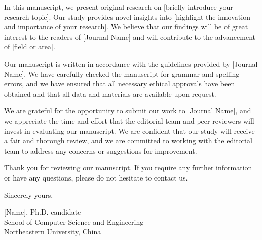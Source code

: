 \documentclass{article}
\begin{document}
In this manuscript, we present original research on [briefly introduce your research topic]. Our study provides novel insights into [highlight the innovation and importance of your research]. We believe that our findings will be of great interest to the readers of [Journal Name] and will contribute to the advancement of [field or area].

Our manuscript is written in accordance with the guidelines provided by [Journal Name]. We have carefully checked the manuscript for grammar and spelling errors, and we have ensured that all necessary ethical approvals have been obtained and that all data and materials are available upon request.

We are grateful for the opportunity to submit our work to [Journal Name], and we appreciate the time and effort that the editorial team and peer reviewers will invest in evaluating our manuscript. We are confident that our study will receive a fair and thorough review, and we are committed to working with the editorial team to address any concerns or suggestions for improvement.

Thank you for reviewing our manuscript. If you require any further information or have any questions, please do not hesitate to contact us.

\bigskip %

Sincerely yours,

\vspace{20pt} %


[Name], Ph.D. candidate \\
School of Computer Science and Engineering\\
Northeastern University, China \\
\end{document}
